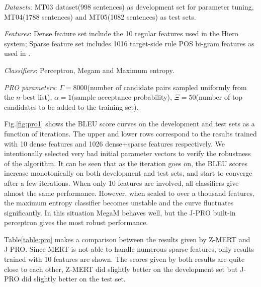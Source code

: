 \documentclass[11pt]{article}
\begin{document}
\emph{Datasets}: MT03 dataset(998 sentences) as development set for parameter tuning, MT04(1788 sentences) and MT05(1082 sentences) as test sets. 

\emph{Features}: Dense feature set include the 10 regular features used in the Hiero system; Sparse feature set includes 1016 target-side rule POS bi-gram features as used in \cite{Li2010coling}.

\emph{Classifiers}: Perceptron, Megam and Maximum entropy.

\emph{PRO parameters}: $\Gamma=8000$(number of candidate pairs sampled uniformly from the $n$-best list), $\alpha=1$(sample acceptance probability), $\Xi=50$(number of top candidates to be added to the training set).

Fig.\ref{fig:pro1} shows the BLEU score curves on the development and test sets as a function of iterations. The upper and lower rows correspond to the results trained with 10 dense features and 1026 dense+sparse features respectively. We intentionally selected very bad initial parameter vectors to verify the robustness of the algorithm. It can be seen that as the iteration goes on, the BLEU scores increase monotonically on both development and test sets, and start to converge after a few iterations. When only 10 features are involved, all classifiers give almost the same performance. However, when scaled to over a thousand features, the maximum entropy classifier becomes unstable and the curve fluctuates significantly. In this situation MegaM behaves well, but the J-PRO built-in perceptron gives the most robust performance. 

Table\ref{table:pro} makes a comparison between the results given by Z-MERT and J-PRO. Since MERT is not able to handle numerous sparse features, only results trained with 10 features are shown. The scores given by both results are quite close to each other, Z-MERT did slightly better on the development set but J-PRO did slightly better on the test set.
\end{document}
